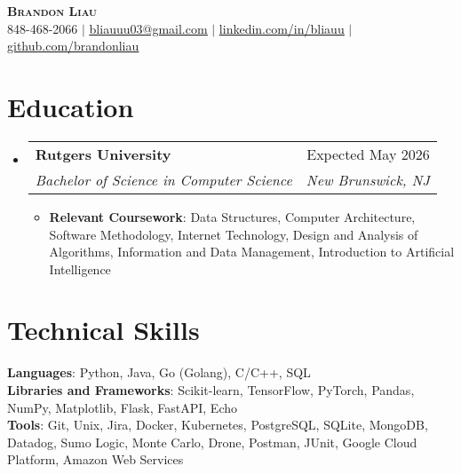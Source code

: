 \documentclass[letterpaper,11pt]{article}
\makeatletter
\newcommand{\resumeItem}[1]{
  \item\small{
    {#1 \vspace{-2pt}}
  }
}
\newcommand{\resumeSubheading}[4]{
  \vspace{-2pt}\item
    \begin{tabular*}{0.97\textwidth}[t]{l@{\extracolsep{\fill}}r}
      \textbf{#1} & #2 \\
      \textit{\small#3} & \textit{\small #4} \\
    \end{tabular*}\vspace{-7pt}
}
\newcommand{\resumeSubHeadingListStart}{\begin{itemize}[leftmargin=0.15in, label={}]}
\newcommand{\resumeSubHeadingListEnd}{\end{itemize}}
\newcommand{\resumeItemListStart}{\begin{itemize}}
\newcommand{\resumeItemListEnd}{\end{itemize}\vspace{-3pt}}
\makeatother
\begin{document}
\begin{center}
    \textbf{\Huge \scshape Brandon Liau} \\ \vspace{8pt}
    \small {} 848-468-2066 $|$ 
    \href{mailto:x@x.com}{ \underline{bliauuu03@gmail.com}} $|$ 
    \href{https://linkedin.com/in/bliauu}{ \underline{linkedin.com/in/bliauu}} $|$
    \href{https://github.com/brandonliau}{ \underline{github.com/brandonliau}}
\end{center}


\section{Education}
  \resumeSubHeadingListStart
    \resumeSubheading
      {Rutgers University}{Expected May 2026}
      {Bachelor of Science in Computer Science}{New Brunswick, NJ}
      \resumeItemListStart
        \resumeItem{\textbf{Relevant Coursework}: Data Structures, Computer Architecture, Software Methodology, Internet Technology, Design and Analysis of Algorithms, Information and Data Management, Introduction to Artificial Intelligence}
      \resumeItemListEnd
  \resumeSubHeadingListEnd


\section{Technical Skills}
 \begin{itemize}[leftmargin=0.15in, label={}]
    \small{\item{
     \textbf{Languages}{: Python, Java, Go (Golang), C/C++, SQL} \vspace{1.5pt}\\
     \textbf{Libraries and Frameworks}{: Scikit-learn, TensorFlow, PyTorch, Pandas, NumPy, Matplotlib, Flask, FastAPI, Echo} \vspace{1.5pt}\\
     \textbf{Tools}{: Git, Unix, Jira, Docker, Kubernetes, PostgreSQL, SQLite, MongoDB, Datadog, Sumo Logic, Monte Carlo, Drone, Postman, JUnit, Google Cloud Platform, Amazon Web Services} \\
    }}
 \end{itemize}


\end{document}
